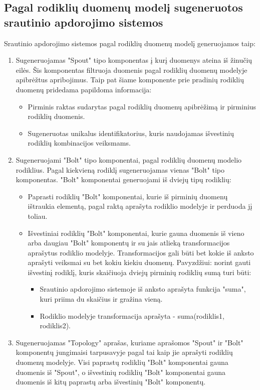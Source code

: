 \documentclass{VUMIFPSbakalaurinis}
\begin{document}
\subsection{Pagal rodiklių duomenų modelį sugeneruotos srautinio apdorojimo sistemos}
Srautinio apdorojimo sistemos pagal rodiklių duomenų modelį generuojamos taip:
\begin{enumerate}
    \item Sugeneruojamas "Spout" tipo komponentas į kurį duomenys ateina iš žinučių eilės. Šis komponentas filtruoja duomenis pagal rodiklių duomenų modelyje apibrėžtus apribojimus. Taip pat šiame komponente prie pradinių rodiklių duomenų pridedama papildoma informacija: 
    \begin{itemize}
        \item Pirminis raktas sudarytas pagal rodiklių duomenų apibrėžimą ir pirminius rodiklių duomenis.
        \item Sugeneruotas unikalus identifikatorius, kuris naudojamas išvestinių rodiklių kombinacijos veiksmams.
    \end{itemize}
    \item Sugeneruojami "Bolt" tipo komponentai, pagal rodiklių duomenų modelio rodiklius. Pagal kiekvieną rodiklį sugeneruojamas vienas "Bolt" tipo komponentas.
    "Bolt" komponentai generuojami iš dviejų tipų rodiklių:
    \begin{itemize}
        \item Paprasti rodiklių "Bolt" komponentai, kurie iš pirminių duomenų ištraukia elementą, pagal raktą aprašyta rodiklio modelyje ir perduoda jį toliau.
        \item Išvestiniai rodiklių "Bolt" komponentai, kurie gauna duomenis iš vieno arba daugiau "Bolt" komponentų ir su jais atlieką transformacijos aprašytus rodiklio modelyje. Transformacijos gali būti bet kokie iš anksto aprašyti veiksmai su bet kokiu kiekiu duomenų. Pavyzdžiui: norint gauti išvestinį rodiklį, kuris skaičiuoja dviejų pirminių rodiklių sumą turi būti:
        \begin{itemize}
            \item Srautinio apdorojimo sistemoje iš anksto aprašyta funkcija "suma", kuri priima du skaičius ir gražina vieną.
            \item Rodiklio modelyje transformacija aprašyta - suma(rodiklis1, rodiklis2).
        \end{itemize} 
    \end{itemize}
    \item Sugeneruojamas "Topology" aprašas, kuriame aprašomos "Spout" ir "Bolt" komponentų jungimaisi tarpusavyje pagal tai kaip jie aprašyti rodiklių duomenų modelyje. Visi paprastų rodiklių "Bolt" komponentai gauna duomenis iš "Spout", o išvestinių rodiklių "Bolt" komponentai gauna duomenis iš kitų paprastų arba išvestinių "Bolt" komponentų.
\end{enumerate}
\end{document}
